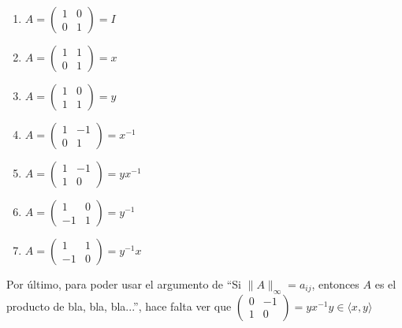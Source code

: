 \documentclass{article}
\newcommand\tab[1][0.6cm]{\hspace*{#1}}
\newcommand\nl{\newline\tab}
\begin{document}
	\begin{enumerate}
			\item
			$
			A = 
			\begin{pmatrix}
			1 & 0 \\
			0 & 1 
			\end{pmatrix} 
			= I
			$
			\item
			$
			A = 
			\begin{pmatrix}
			1 & 1 \\
			0 & 1 
			\end{pmatrix} 
			= x
			$
			\item
			$
			A = 
			\begin{pmatrix}
			1 & 0 \\
			1 & 1 
			\end{pmatrix} 
			= y
			$
			\item
			$
			A = 
			\begin{pmatrix}
			1 & -1 \\
			0 & 1 
			\end{pmatrix} 
			= x^{-1}
			$
			\item
			$
			A = 
			\begin{pmatrix}
			1 & -1 \\
			1 & 0 
			\end{pmatrix} 
			= yx^{-1}
			$			
			\item
			$
			A = 
			\begin{pmatrix}
			1 & 0 \\
			-1 & 1 
			\end{pmatrix} 
			= y^{-1}
			$
			\item
			$
			A = 
			\begin{pmatrix}
			1 & 1 \\
			-1 & 0 			
			\end{pmatrix} 
			= y^{-1}x			
			$					
		
		\end{enumerate}
	
	Por último, para poder usar el argumento de ``Si $\|A\|_\infty = a_{ij}$, entonces $A$ es el producto de bla, bla, bla...'', hace falta ver que
	$\begin{pmatrix}
	0 & -1 \\
	1 & 0 
	\end{pmatrix} = yx^{-1}y \in \langle x, y \rangle$\nl\nl
	
\end{document}
